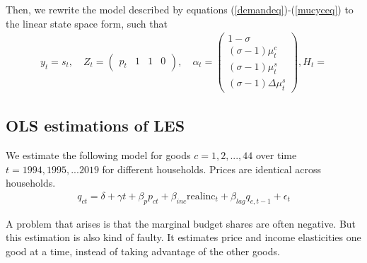 Then, we rewrite the model described by equations (\ref{demandeq})-(\ref{mucyceq}) to the linear state space form, such that
\begin{align}
    y_t = s_t , \quad Z_t = \begin{pmatrix} p_t & 1 & 1 & 0 \end{pmatrix}, \quad \alpha_t = \begin{pmatrix} 1-\sigma \\ (\sigma-1) \mu^c_t   \\ (\sigma-1) \mu^s_t \\ (\sigma-1) \Delta \mu^s_t \end{pmatrix}, H_t = 
\end{align}


\subsection{OLS estimations of LES}
We estimate the following model for goods $c=1,2,...,44$ over time $t=1994,1995,...2019$ for different households. Prices are identical across households.
\begin{align}
    q_{ct} = \delta + \gamma t + \beta_p p_{ct} + \beta_{inc} \text{realinc}_t + \beta_{lag} q_{c,t-1} + \epsilon_t
\end{align}

A problem that arises is that the marginal budget shares are often negative. But this estimation is also kind of faulty. It estimates price and income elasticities one good at a time, instead of taking advantage of the other goods.
\newpage

\begin{landscape}

\end{landscape}
